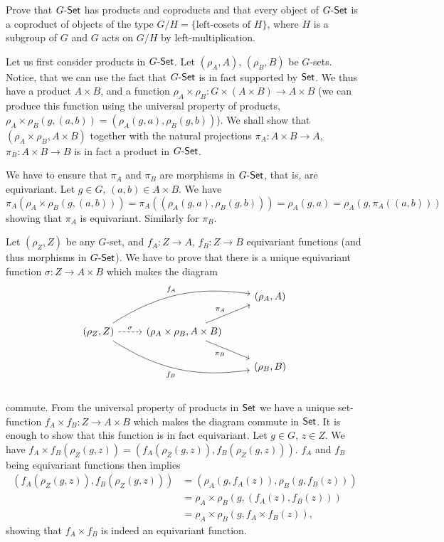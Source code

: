 \begin{problem}
	Prove that $G\text{-}\mathsf{Set}$ has products and coproducts and that every object of $G\text{-}\mathsf{Set}$ is a coproduct of objects of the type $G/H = \{ \text{left-cosets of } H \}$, where $H$ is a subgroup of $G$ and $G$ acts on $G/H$ by left-multiplication.
\end{problem}

\begin{solution}
	Let us first consider products in $G\text{-}\mathsf{Set}$. Let $(\rho_A, A)$, $(\rho_B, B)$ be $G$-sets. Notice, that we can use the fact that $G\text{-}\mathsf{Set}$ is in fact supported by $\mathsf{Set}$. We thus have a product $A \times B$, and a function $\rho_A \times \rho_B: G \times (A \times B) \to A \times B$ (we can produce this function using the universal property of products, $\rho_A \times \rho_B (g, (a, b)) = (\rho_A(g, a), \rho_B(g,b))$). We shall show that $(\rho_A \times \rho_B, A \times B)$ together with the natural projections $\pi_A: A \times B \to A$, $\pi_B: A \times B \to B$ is in fact a product in $G\text{-}\mathsf{Set}$.
	
	We have to ensure that $\pi_A$ and $\pi_B$ are morphisms in $G\text{-}\mathsf{Set}$, that is, are equivariant. Let $g \in G$, $(a, b) \in A \times B$. We have $\pi_A(\rho_A \times \rho_B(g, (a, b))) = \pi_A((\rho_A(g, a), \rho_B(g, b))) = \rho_A(g, a) = \rho_A(g, \pi_A((a, b)))$ showing that $\pi_A$ is equivariant. Similarly for $\pi_B$.
	
	Let $(\rho_Z, Z)$ be any $G$-set, and $f_A: Z \to A$, $f_B: Z \to B$ equivariant functions (and thus morphisms in $G\text{-}\mathsf{Set}$). We have to prove that there is a unique equivariant function $\sigma: Z \to A \times B$ which makes the diagram
		\begin{equation*}
		\begin{tikzcd}
			& & (\rho_A, A) \\
			(\rho_Z, Z)
			\arrow[r, dashrightarrow, "\sigma"]
			\arrow[urr, bend left=20, "f_A"]
			\arrow[drr, bend right=20, "f_B"'] &
			(\rho_A \times \rho_B, A \times B)
			\arrow[ur, "\pi_A"]
			\arrow[dr, "\pi_B"'] & \\
			& & (\rho_B, B) \\
		\end{tikzcd}
	\end{equation*}
	commute. From the universal property of products in $\mathsf{Set}$ we have a unique set-function $f_A \times f_B: Z \to A \times B$ which makes the diagram commute in $\mathsf{Set}$. It is enough to show that this function is in fact equivariant. Let $g \in G$, $z \in Z$. We have $f_A \times f_B(\rho_Z(g, z))= (f_A(\rho_Z(g, z)), f_B(\rho_Z(g, z)))$. $f_A$ and $f_B$ being equivariant functions then implies
	\[
		\begin{aligned}
			(f_A(\rho_Z(g, z)), f_B(\rho_Z(g, z))) &= (\rho_A(g, f_A(z)), \rho_B(g, f_B(z))) \\
			&= \rho_A \times \rho_B (g, (f_A(z), f_B(z))) \\
			&= \rho_A \times \rho_B (g, f_A \times f_B (z)) \text{,}
		\end{aligned}
	\]
	showing that $f_A \times f_B$ is indeed an equivariant function.
	

\end{solution}
